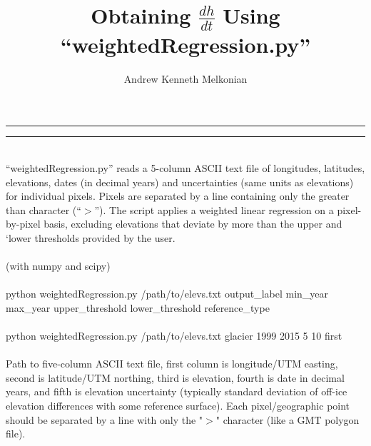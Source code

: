 \documentclass[12pt]{article}
\title{Obtaining $\frac{dh}{dt}$ Using ``weightedRegression.py''}
\author{Andrew Kenneth Melkonian}
\begin{document}
\maketitle

\vspace{2pt}
\hrule
\vspace{6pt}
\vspace{6pt}
\hrule
\vspace{16pt}

 \\

``weightedRegression.py'' reads a 5-column ASCII text file of longitudes, latitudes, elevations, dates (in decimal years) and  uncertainties (same units as elevations) for individual pixels.
Pixels are separated by a line containing only the greater than character (``$>$'').
The script applies a weighted linear regression on a pixel-by-pixel basis, excluding elevations that deviate by more than the upper and `lower thresholds provided by the user. \\

 \\

 (with numpy and scipy) \\

 \\

\noindent python weightedRegression.py /path/to/elevs.txt output\_label min\_year max\_year upper\_threshold lower\_threshold reference\_type \\

 \\

\noindent python weightedRegression.py /path/to/elevs.txt glacier 1999 2015 5 10 first \\

 \\

 Path to five-column ASCII text file, first column is longitude/UTM easting, second is latitude/UTM northing, third is elevation, fourth is date in decimal years, and fifth is elevation uncertainty (typically standard deviation of off-ice elevation differences with some reference surface).
Each pixel/geographic point should be separated by a line with only the "$>$" character (like a GMT polygon file). \\
\end{document}
